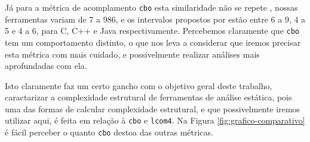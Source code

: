 Já para a métrica de acomplamento \texttt{cbo} esta similaridade não se repete
, nossas ferramentas variam de 7 a 986, e os intervalos propostos por
\cite{Meirelles2013} estão entre 6 a 9, 4 a 5 e 4 a 6, para C, C++ e Java
respectivamente. Percebemos claramente que \texttt{cbo} tem um comportamento
distinto, o que nos leva a considerar que iremos precisar esta métrica com
mais cuidado, e possivelmente realizar análises mais aprofundadas com ela.

Isto claramente faz um certo gancho com o objetivo geral deste trabalho,
caractarizar a complexidade estrutural de ferramentas de análise estática,
pois uma das formas de calcular complexidade estrutural, e que possivelmente
iremos utilizar aqui, é feita em relação à \texttt{cbo} e \texttt{lcom4}. Na
Figura \ref{fig:grafico-comparativo} é fácil perceber o quanto \texttt{cbo} destoa
das outras métricas.

%
%
%
%
%
%

